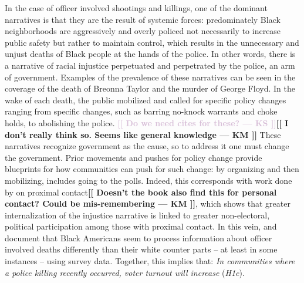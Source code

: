 \documentclass[12pt]{article}
\newcommand{\kscomment}[1]{\textbf{\textcolor{Thistle}{[[ #1 --- KS ]]}}}
\newcommand{\kmcomment}[1]{\textbf{\textcolor{JungleGreen}{[[ #1 --- KM ]]}}}
\begin{document}
In the case of officer involved shootings and killings, one of the dominant narratives is that they are the result of systemic forces: predominately Black neighborhoods are aggressively and overly policed not necessarily to increase public safety but rather to maintain control, which results in the unnecessary and unjust deaths of Black people at the hands of the police. In other words, there is a narrative of racial injustice perpetuated and perpetrated by the police, an arm of government. Examples of the prevalence of these narratives can be seen in the coverage of the death of Breonna Taylor and the murder of George Floyd. In the wake of each death, the public mobilized and called for specific policy changes ranging from specific changes, such as barring no-knock warrants and choke holds, to abolishing the police. \kscomment{Do we need cites for these?}\kmcomment{I don't really think so. Seems like general knowledge} These narratives recognize government as the cause, so to address it one must change the government. Prior movements and pushes for policy change provide blueprints for how communities can push for such change: by organizing and then mobilizing, includes going to the polls. %
Indeed, this corresponds with work done by  \cite{walker2019targeted,walker2020mobilized} on proximal contact\kmcomment{Doesn't the book also find this for personal contact? Could be mis-remembering}, which shows that greater internalization of the injustice narrative is linked to greater non-electoral, political participation among those with proximal contact. 
In this vein, \cite{jefferson2021seeing} and \cite{burch2021notall} document that Black Americans seem to process information about officer involved deaths differently than their white counter parts -- at least in some instances -- using survey data. 
Together, this implies that: \textit{In communities where a police killing recently occurred, voter turnout will increase} (\textit{H1c}). 
\end{document}
